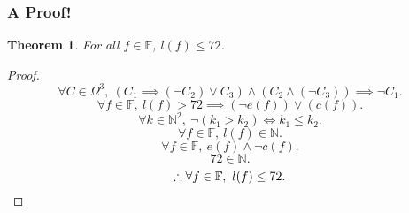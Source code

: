 \documentclass{report}
\newtheorem{thm}{Theorem}
\begin{document}
\subsubsection{A Proof!}
\begin{thm}
        For all $f \in \mathbb F$, $l(f) \leq 72$.
\end{thm}
\begin{proof}
        \[
                \forall C \in \Omega^3,\ 
                \left(C_1 \implies (\neg C_2) \lor C_3\right)
                \land
                \left(C_2 \land (\neg C_3)\right)
                \implies \neg C_1.
        \]
        \[
                \forall f \in \mathbb F,\ 
                l(f) > 72 \implies \left(\neg e(f)\right) \lor \left(c(f)\right).
        \]
        \[
                \forall k \in \mathbb N^2,\ 
                \neg \left(k_1 > k_2\right) \iff k_1 \leq k_2.
        \]
        \[
                \forall f \in \mathbb F,\ 
                l(f) \in \mathbb N.
        \]
        \[
                \forall f \in \mathbb F,\ 
                e(f) \land \neg c(f).
        \]
        \[
                72 \in \mathbb N.
        \]
        \[
                \therefore
                \forall f \in \mathbb F,\ 
                l(f) \leq 72.
                \qedhere
        \]
\end{proof}
\end{document}
